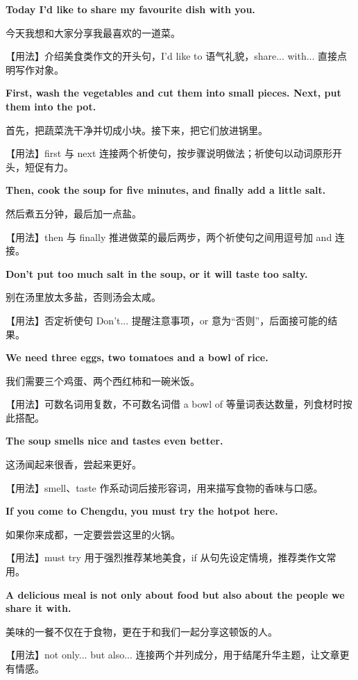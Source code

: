 \documentclass[UTF8,a4paper,11pt,oneside]{ctexbook}
\newcommand{\fansection}[1]{%
  \par\addvspace{2.4ex}%
  \Needspace{6\baselineskip}%
  \noindent{\sffamily\Large\bfseries\color{mainblue}#1}\par
  \nopagebreak
  \addvspace{0.2ex}%
  \noindent{\color{rulelight}\rule{\linewidth}{0.9pt}}\par
  \addvspace{0.9ex}%
  \nobreak
}
\newcommand{\fanpat}[3]{%
  \item{\bfseries #1}\par\nopagebreak
  {\small\color{textgray}#2}\par\nopagebreak
  {\footnotesize\color{accent!90!black}【用法】#3}\par
}
\begin{document}
\fansection{〇、本单元写作常用句型}
\begin{fanpatterns}
\fanpat{Today I'd like to share my favourite dish with you.}{今天我想和大家分享我最喜欢的一道菜。}{介绍美食类作文的开头句，I'd like to 语气礼貌，share... with... 直接点明写作对象。}

\fanpat{First, wash the vegetables and cut them into small pieces. Next, put them into the pot.}{首先，把蔬菜洗干净并切成小块。接下来，把它们放进锅里。}{first 与 next 连接两个祈使句，按步骤说明做法；祈使句以动词原形开头，短促有力。}

\fanpat{Then, cook the soup for five minutes, and finally add a little salt.}{然后煮五分钟，最后加一点盐。}{then 与 finally 推进做菜的最后两步，两个祈使句之间用逗号加 and 连接。}

\fanpat{Don't put too much salt in the soup, or it will taste too salty.}{别在汤里放太多盐，否则汤会太咸。}{否定祈使句 Don't... 提醒注意事项，or 意为“否则”，后面接可能的结果。}

\fanpat{We need three eggs, two tomatoes and a bowl of rice.}{我们需要三个鸡蛋、两个西红柿和一碗米饭。}{可数名词用复数，不可数名词借 a bowl of 等量词表达数量，列食材时按此搭配。}

\fanpat{The soup smells nice and tastes even better.}{这汤闻起来很香，尝起来更好。}{smell、taste 作系动词后接形容词，用来描写食物的香味与口感。}

\fanpat{If you come to Chengdu, you must try the hotpot here.}{如果你来成都，一定要尝尝这里的火锅。}{must try 用于强烈推荐某地美食，if 从句先设定情境，推荐类作文常用。}

\fanpat{A delicious meal is not only about food but also about the people we share it with.}{美味的一餐不仅在于食物，更在于和我们一起分享这顿饭的人。}{not only... but also... 连接两个并列成分，用于结尾升华主题，让文章更有情感。}

\end{fanpatterns}

\fansection{一、满分范文}
\end{document}
